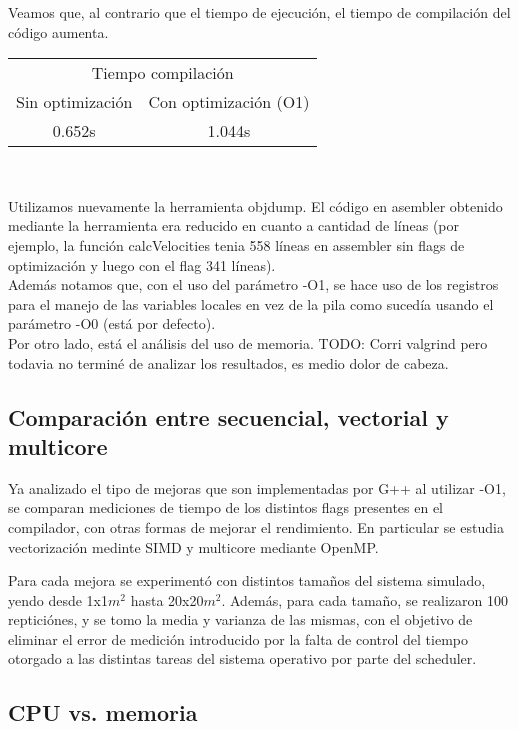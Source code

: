 Veamos que, al contrario que el tiempo de ejecución, el tiempo de compilación del código aumenta.\\

\begin{center}
	\begin{tabular}{cc}  
		\toprule 
		\multicolumn{2}{c}{Tiempo compilación} \\
		\cmidrule(r){1-2}
		Sin optimización & Con optimización (O1) \\
		\midrule
		0.652s	&	1.044s	\\
		\bottomrule
	\end{tabular}\\
\end{center}

Utilizamos nuevamente la herramienta objdump. El código en asembler obtenido mediante la herramienta era reducido en cuanto a cantidad de líneas (por ejemplo, la función calcVelocities tenia 558 líneas en assembler sin flags de optimización y luego con el flag 341 líneas).\\

Además notamos que, con el uso del parámetro -O1, se hace uso de los registros para el manejo de las variables locales en vez de la pila como sucedía usando el parámetro -O0 (está por defecto).\\

Por otro lado, está el análisis del uso de memoria.
TODO: Corri valgrind pero todavia no terminé de analizar los resultados, es medio dolor de cabeza.


\subsection{Comparación entre secuencial, vectorial y multicore}
Ya analizado el tipo de mejoras que son implementadas por G++ al utilizar -O1, se comparan mediciones de tiempo de los distintos flags presentes en el compilador, con otras formas de mejorar el rendimiento. En particular se estudia vectorización medinte SIMD y multicore mediante OpenMP.

Para cada mejora se experimentó con distintos tamaños del sistema simulado, yendo desde 1x1$m^2$ hasta 20x20$m^2$. Además, para cada tamaño, se realizaron 100 repticiónes, y se tomo la media y varianza de las mismas, con el objetivo de eliminar el error de medición introducido por la falta de control del tiempo otorgado a las distintas tareas del sistema operativo por parte del scheduler.

\subsection{CPU vs. memoria}

